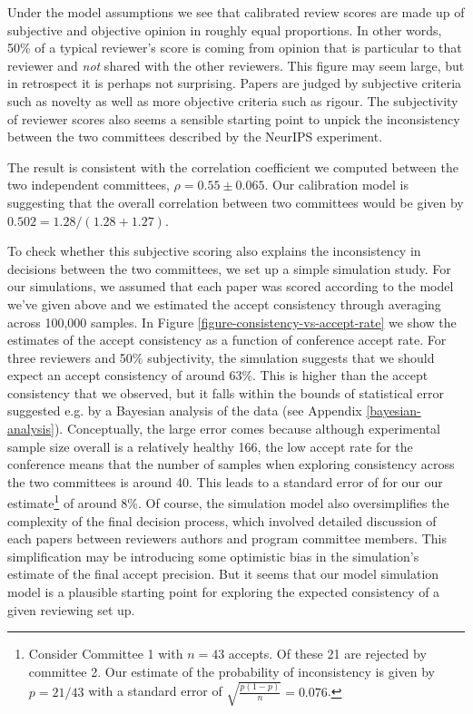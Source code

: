 \documentclass[twoside]{article}
\begin{document}
Under the model assumptions we see that calibrated review scores are
made up of subjective and objective opinion in roughly equal
proportions. In other words, 50\% of a typical reviewer's score is
coming from opinion that is particular to that reviewer and \emph{not}
shared with the other reviewers. This figure may seem large, but in
retrospect it is perhaps not surprising. Papers are judged by
subjective criteria such as novelty as well as more objective criteria
such as rigour. The subjectivity of reviewer scores also seems a
sensible starting point to unpick the inconsistency between the two
committees described by the NeurIPS experiment. 


The result is consistent with the correlation coefficient we computed
between the two independent committees, $\rho = 0.55 \pm 0.065$. Our
calibration model is suggesting that the overall correlation between
two committees would be given by $0.502 = 1.28/(1.28+1.27)$.

To check whether this subjective scoring also explains the
inconsistency in decisions between the two committees, we set up a
simple simulation study. For our simulations, we assumed that each
paper was scored according to the model we've given above and we
estimated the accept consistency through averaging across 100,000
samples. In Figure \ref{figure-consistency-vs-accept-rate} we show the
estimates of the accept consistency as a function of conference accept
rate. For three reviewers and 50\% subjectivity, the simulation
suggests that we should expect an accept consistency of around
63\%. This is higher than the accept consistency that we
observed, but it falls within the bounds of statistical error suggested e.g. by
a Bayesian analysis of the data (see Appendix \ref{bayesian-analysis}). Conceptually, the large error comes because although experimental sample size overall is a relatively healthy 166, the low accept rate for the conference means that the number of samples when exploring consistency across the two committees is around 40. This leads to a standard error of for our our estimate\footnote{Consider Committee 1 with $n=43$ accepts. Of these 21 are rejected by committee 2. Our estimate of the probability of inconsistency is given by $p=21/43$ with a standard error of $\sqrt{\frac{p(1-p)}{n}} = 0.076$.} of around 8\%.
Of course, the simulation model also oversimplifies the complexity of the final decision process, which involved detailed discussion of each papers between reviewers authors and program committee members. This simplification may be introducing some optimistic bias in the simulation's estimate of the final accept precision. But it seems that our model simulation model is a plausible starting point for exploring the expected consistency of a given reviewing set up.
\end{document}
